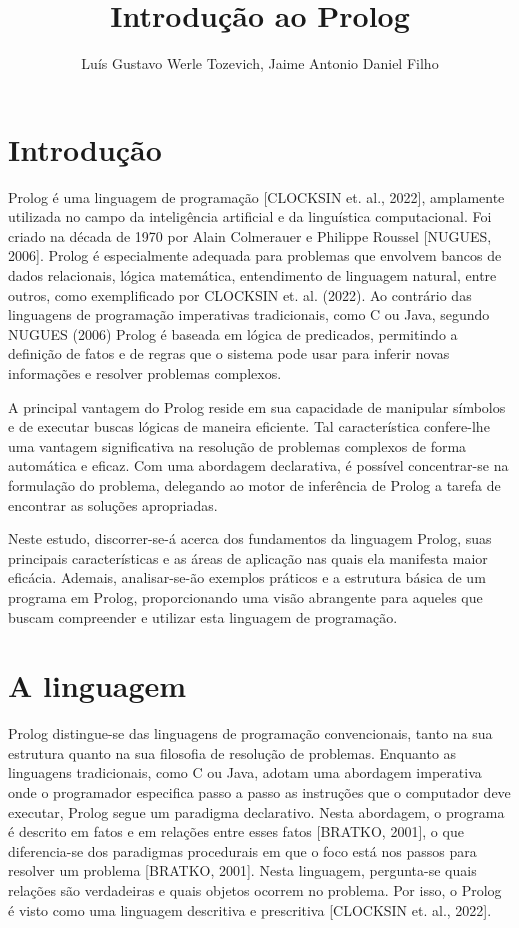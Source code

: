 \documentclass[12pt]{article}
\title{Introdução ao Prolog}
\author{Luís Gustavo Werle Tozevich\inst{1}, Jaime Antonio Daniel Filho\inst{1}}
\begin{document}
 

\maketitle

\section{Introdução}

Prolog é uma linguagem de programação [CLOCKSIN et. al., 2022], amplamente utilizada no campo da inteligência artificial e da linguística computacional. Foi criado na década de 1970 por Alain Colmerauer e Philippe Roussel [NUGUES, 2006]. Prolog é especialmente adequada para problemas que envolvem bancos de dados relacionais, lógica matemática, entendimento de linguagem natural, entre outros, como exemplificado por CLOCKSIN et. al. (2022). Ao contrário das linguagens de programação imperativas tradicionais, como C ou Java, segundo NUGUES (2006) Prolog é baseada em lógica de predicados, permitindo a definição de fatos e de regras que o sistema pode usar para inferir novas informações e resolver problemas complexos.

A principal vantagem do Prolog reside em sua capacidade de manipular símbolos e de executar buscas lógicas de maneira eficiente. Tal característica confere-lhe uma vantagem significativa na resolução de problemas complexos de forma automática e eficaz. Com uma abordagem declarativa, é possível concentrar-se na formulação do problema, delegando ao motor de inferência de Prolog a tarefa de encontrar as soluções apropriadas.

Neste estudo, discorrer-se-á acerca dos fundamentos da linguagem Prolog, suas principais características e as áreas de aplicação nas quais ela manifesta maior eficácia. Ademais, analisar-se-ão exemplos práticos e a estrutura básica de um programa em Prolog, proporcionando uma visão abrangente para aqueles que buscam compreender e utilizar esta linguagem de programação.

\section{A linguagem} \label{sec:firstpage}

Prolog distingue-se das linguagens de programação convencionais, tanto na sua estrutura quanto na sua filosofia de resolução de problemas. Enquanto as linguagens tradicionais, como C ou Java, adotam uma abordagem imperativa onde o programador especifica passo a passo as instruções que o computador deve executar, Prolog segue um paradigma declarativo. Nesta abordagem, o programa é descrito em fatos e em relações entre esses fatos [BRATKO, 2001], o que diferencia-se dos paradigmas procedurais em que o foco está nos passos para resolver um problema [BRATKO, 2001]. Nesta linguagem, pergunta-se quais relações são verdadeiras e quais objetos ocorrem no problema. Por isso, o Prolog é visto como uma linguagem descritiva e prescritiva [CLOCKSIN et. al., 2022].
\end{document}
